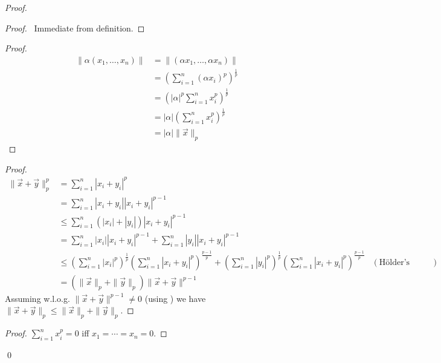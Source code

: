 \begin{proof}
\pf
{}
\begin{proof}
	\pf\ Immediate from definition.
\end{proof}
\begin{proof}
	\pf
	\begin{align*}
		\| \alpha (x_1, \ldots, x_n) \|
		& = \| (\alpha x_1, \ldots, \alpha x_n) \| \\
		& = \left( \sum_{i=1}^n (\alpha x_i)^p \right)^{\frac{1}{p}} \\
		& = \left( |\alpha|^p \sum_{i=1}^n x_i^p \right)^{\frac{1}{p}} \\
		& = |\alpha| \left( \sum_{i=1}^n x_i^p \right)^{\frac{1}{p}} \\
		& = |\alpha| \|\vec{x}\|_p
	\end{align*}
\end{proof}
\begin{proof}
	\pf
	\begin{align*}
		\| \vec{x} + \vec{y} \|_p^p
		& = \sum_{i=1}^n |x_i + y_i|^p \\
		& = \sum_{i=1}^n |x_i + y_i| |x_i + y_i|^{p-1} \\
		& \leq \sum_{i=1}^n (|x_i| + |y_i|) |x_i + y_i|^{p-1} \\
		& = \sum_{i=1}^n |x_i| |x_i + y_i|^{p-1} + \sum_{i=1}^n |y_i| |x_i + y_i|^{p-1} \\
		& \leq \left( \sum_{i=1}^n |x_i|^p \right)^{\frac{1}{p}} \left( \sum_{i=1}^n |x_i + y_i|^p \right)^{\frac{p-1}{p}} + \left( \sum_{i=1}^n |y_i|^p \right)^{\frac{1}{p}} \left( \sum_{i=1}^n |x_i + y_i|^p \right)^{\frac{p-1}{p}} & (\text{H\"{o}lder's Inequality}) \\
		& = ( \|\vec{x}\|_p + \|\vec{y}\|_p) \| \vec{x} + \vec{y} \|^{p-1}
	\end{align*}
	Assuming w.l.o.g. $\| \vec{x} + \vec{y} \|^{p-1} \neq 0$ (using ) we have $\| \vec{x} + \vec{y} \|_p \leq \| \vec{x} \|_p + \| \vec{y} \|_p$. 	
\end{proof}
\begin{proof}
	\pf $\sum_{i=1}^n x_i^p = 0$ iff $x_1 = \cdots = x_n  = 0$.
\end{proof}
\qed
\end{proof}

